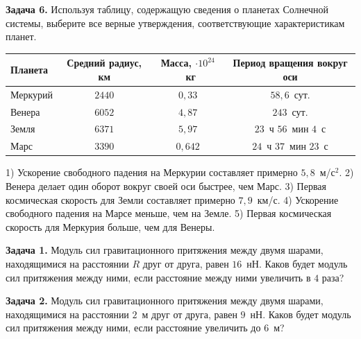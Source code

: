 \begin{taskbasic}[code={\label{task:gravity_v18_n5}}]
\textbf{Задача 6.} Используя таблицу, содержащую сведения о планетах Солнечной системы, выберите все верные утверждения, соответствующие характеристикам планет.
\begin{center}
\begin{tabular}{|l|c|c|c|}
\hline
\textbf{Планета} & \textbf{Средний радиус, км} & \textbf{Масса, $\cdot 10^{24}$~кг} & \textbf{Период вращения вокруг оси} \\ \hline
Меркурий & $2440$ & $0{,}33$ & $58{,}6$~сут. \\ \hline
Венера   & $6052$ & $4{,}87$ & $243$~сут. \\ \hline
Земля    & $6371$ & $5{,}97$ & $23$~ч $56$~мин $4$~с \\ \hline
Марс     & $3390$ & $0{,}642$ & $24$~ч $37$~мин $23$~с \\ \hline
\end{tabular}
\end{center}

1) Ускорение свободного падения на Меркурии составляет примерно $5{,}8$~м/с$^{2}$.
2) Венера делает один оборот вокруг своей оси быстрее, чем Марс.
3) Первая космическая скорость для Земли составляет примерно $7{,}9$~км/с.
4) Ускорение свободного падения на Марсе меньше, чем на Земле.
5) Первая космическая скорость для Меркурия больше, чем для Венеры.

\end{taskbasic}


\begin{taskbasic}[code={\label{task:gravity_v23_n2}}]
\textbf{Задача 1.} Модуль сил гравитационного притяжения между двумя шарами, находящимися на расстоянии $R$ друг от друга, равен $16$~нН. Каков будет модуль сил притяжения между ними, если расстояние между ними увеличить в $4$ раза?

\end{taskbasic}

\begin{taskbasic}[code={\label{task:gravity_v24_n2}}]
\textbf{Задача 2.} Модуль сил гравитационного притяжения между двумя шарами, находящимися на расстоянии $2$~м друг от друга, равен $9$~нН. Каков будет модуль сил притяжения между ними, если расстояние увеличить до $6$~м?

\end{taskbasic}

